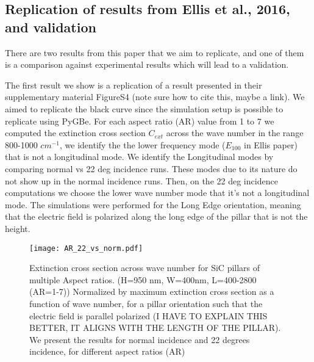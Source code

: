  \subsection{Replication of results from Ellis et al., 2016, and validation}

There are two results from this paper that we aim to replicate, and one of them is a comparison
against experimental results which will lead to a validation. 

The first result we show is a replication of a result presented in their supplementary 
material FigureS4 {\color{red}(note sure how to cite this, maybe a link)}. We aimed to replicate the 
black curve since the simulation setup is possible to replicate using PyGBe. For each aspect ratio (AR) 
value from 1 to 7 we computed the extinction cross section $C_{ext}$ across the wave number in the range
800-1000 $cm^{-1}$, we identify the the lower frequency mode ($E_{100}$ in Ellis paper)  that is not a 
longitudinal mode. We identify the Longitudinal modes by comparing normal vs 22 deg incidence runs. These
modes due to its nature do not show up in the normal incidence runs. Then, on the 22 deg incidence 
computations we choose the lower wave number mode that it's not a longitudinal mode. The simulations were 
performed for the Long Edge orientation, meaning that the electric field is polarized along the long edge 
of the pillar that is not the height. 

\begin{figure}
    \centering
    \texttt{[image: AR\_22\_vs\_norm.pdf]} 
    \caption{ Extinction cross section across wave number for SiC pillars of multiple Aspect ratios. 
             (H=950 nm, W=400nm, L=400-2800 (AR=1-7))
            Normalized by maximum extinction cross section as a function of wave number,
            for a pillar orientation such that the electric field is parallel polarized 
            (I HAVE TO EXPLAIN THIS BETTER, IT ALIGNS WITH THE LENGTH OF THE PILLAR). 
            We present the results for normal incidence and 22 degrees incidence, 
            for different aspect ratios (AR)
            }
    \label{fig:AR_22_vs_norm}
 \end{figure}


